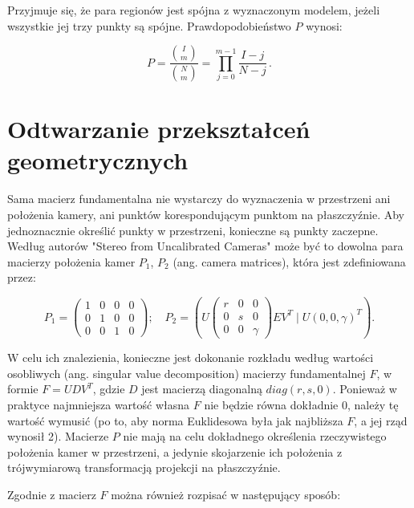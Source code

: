 Przyjmuje się, że para regionów jest spójna z wyznaczonym modelem, jeżeli
wszystkie jej trzy punkty są spójne. Prawdopodobieństwo $P$ wynosi: 

\begin{equation} P = \frac{{I \choose m}}{{N \choose m}} =
  \prod_{j=0}^{m-1}\frac{I - j}{N-j} \,.  \end{equation}

\section{Odtwarzanie przekształceń geometrycznych}

Sama macierz fundamentalna nie wystarczy do wyznaczenia w przestrzeni ani
położenia kamery, ani punktów korespondującym punktom na płaszczyźnie. Aby
jednoznacznie określić punkty w przestrzeni, konieczne są punkty zaczepne.
Według autorów "Stereo from Uncalibrated Cameras" \cite{stereo} może być to
dowolna para macierzy położenia kamer $P_1$, $P_2$ (ang. camera matrices),
która jest zdefiniowana przez:

\begin{equation}
  P_1 = \begin{pmatrix} 
    1 & 0 & 0 & 0 \\
    0 & 1 & 0 & 0 \\
    0 & 0 & 1 & 0
  \end{pmatrix}
;\quad P_2 = (U \begin{pmatrix} 
    r & 0 & 0 \\
    0 & s & 0 \\
    0 & 0 & \gamma
  \end{pmatrix} E V^T\; |\; U(0,0,\gamma)^T).
\end{equation}

W celu ich znalezienia, konieczne jest dokonanie rozkładu według wartości
osobliwych (ang. singular value decomposition) macierzy fundamentalnej $F$, w
formie $F = UDV^T$, gdzie $D$ jest macierzą diagonalną $diag(r,s,0)$. Ponieważ
w praktyce najmniejsza wartość własna $F$ nie będzie równa dokładnie 0, należy
tę wartość wymusić (po to, aby norma Euklidesowa była jak najbliższa $F$, a
jej rząd wynosił 2).  Macierze $P$ nie mają na celu dokładnego określenia
rzeczywistego położenia kamer w przestrzeni, a jedynie skojarzenie ich
położenia z trójwymiarową transformacją projekcji na płaszczyźnie.

Zgodnie z \cite{stereo} macierz $F$ można również rozpisać w następujący sposób:

